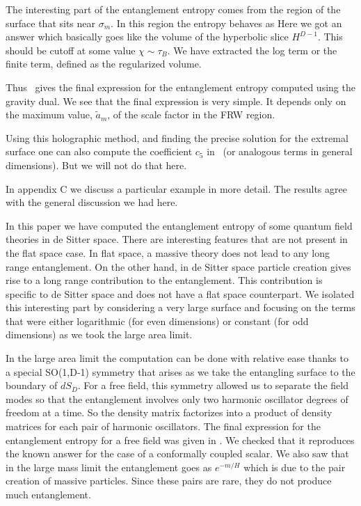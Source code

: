 The interesting part of the entanglement entropy comes from the region of the surface that sits near
$\sigma_m$. In this region the entropy behaves as
\eqn{}
Here we got an answer which basically goes like the volume of the hyperbolic slice $H^{D-1}$. This
should be cutoff at some value $\chi \sim \tau_B$. We have extracted the log term or the finite term,
defined as the regularized volume.

Thus \acsby\ gives the final expression for the entanglement entropy computed using the gravity dual.
We see that the final expression is very simple. It depends only on the maximum value, $\tilde a_m$,
of the scale factor in the FRW region.

Using this holographic method, and finding the precise solution for the extremal surface 
 one can also
compute the coefficient $c_5$ in \entir\ (or analogous terms in general dimensions). But we will 
not do that here. 

In appendix C we discuss a particular example in more detail.
 The results agree with the general discussion we had here.

In this paper we have computed the entanglement entropy of some quantum field theories in
de Sitter space. There are interesting features that are not present in the flat space case.
In flat space, a massive theory does not lead to any long range entanglement.
On the other hand, in de Sitter space particle creation
 gives rise to a long range contribution to the
entanglement. This contribution is specific to de Sitter space and does not have a flat
space counterpart. We   isolated this interesting part by considering a very large surface and
focusing on the terms that were either logarithmic (for even dimensions) or constant (for odd dimensions)
as we took the large area limit.

In the large area limit the computation can be done with relative ease thanks to a special SO(1,D-1) symmetry
that arises as we take the entangling surface to the boundary of $dS_D$. For a free field, this symmetry
allowed us to separate the field modes so that the entanglement involves only two harmonic oscillator
degrees of freedom at a time. So the density matrix factorizes into a product of density matrices for
each pair of harmonic oscillators. The final expression for the entanglement entropy for a free field
was given in \entanglr . We checked that it reproduces the known answer for the case of a conformally
coupled scalar. We also saw that in the large mass limit the entanglement goes as $e^{ - m/H}$ which
is due to the pair creation of massive particles. Since these pairs are rare, they do not 
produce much entanglement.

